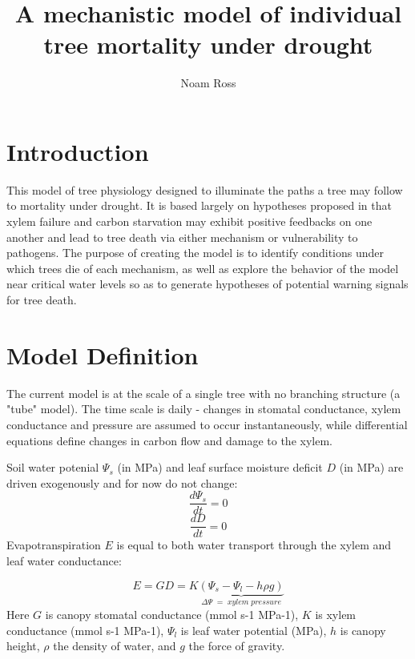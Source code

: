 \documentclass[12pt]{amsart}
\title{A mechanistic model of individual tree mortality under drought}
\author{Noam Ross}
\begin{document}


\maketitle

\section{Introduction}

This model of tree physiology designed to illuminate the paths a tree may follow to mortality under drought.  It is based largely on hypotheses proposed in \citet{McDowell2011} that xylem failure and carbon starvation may exhibit positive feedbacks on one another and lead to tree death via either mechanism or vulnerability to pathogens.  The purpose of creating the model is to identify  conditions under which trees die of each mechanism, as well as explore the behavior of the model near critical water levels so as to generate hypotheses of potential warning signals for tree death.

\section{Model Definition}

The current model is at the scale of a single tree with no branching structure (a "tube" model).  The time scale is daily - changes in stomatal conductance, xylem conductance and pressure are assumed to occur instantaneously, while differential equations define changes in carbon flow and damage to the xylem.

Soil water potenial $\Psi_s$ (in MPa) and leaf surface moisture deficit $D$ (in MPa) are driven exogenously and for now do not change:
\begin{equation}\label{Psi_s}
\frac{d\Psi_s}{dt} = 0
\end{equation}
\begin{equation}\label{sD}
\frac{dD}{dt} = 0
\end{equation}
Evapotranspiration $E$ is equal to both water transport through the xylem and leaf water conductance:

\begin{equation}\label{E}
E = GD = K\underbrace{(\Psi_s - \Psi_l - h\rho g)}_{\Delta\Psi \; = \;xylem\;  pressure}
\end{equation}
Here $G$ is canopy stomatal conductance (mmol s-1 MPa-1), $K$ is xylem conductance (mmol s-1 MPa-1), $\Psi_l$ is leaf water potential (MPa), $h$ is canopy height, $\rho$ the density of water, and $g$ the force of gravity.
\end{document}
